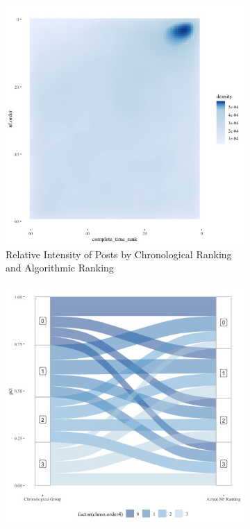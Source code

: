 \documentclass[12pt,letterpaper]{article}
\begin{document}
\begin{figure}[ht]
\caption{Relationship between Newsfeed Algorithmic Ranking and Chronology and User Stated Preferences }
\label{fig:nf}
    \begin{subfigure}{.5\textwidth} 
        \centering
        \includegraphics[width=1\linewidth]{Output/Graphs/Audit/Heatmaps/US NF chron rank by nf rank - smooth.jpg}   
        \caption{Relative Intensity of Posts by Chronological Ranking and Algorithmic Ranking}
        \label{fig:nftime_hm}
        \end{subfigure}
    \begin{subfigure}{.5\textwidth}
        \begin{center}
        \includegraphics[width=1\linewidth]{Output/Graphs/Audit/Sankey flows/US NF chronology to actual.jpg}  

\end{center}
\end{subfigure}
\end{figure}
\end{document}

